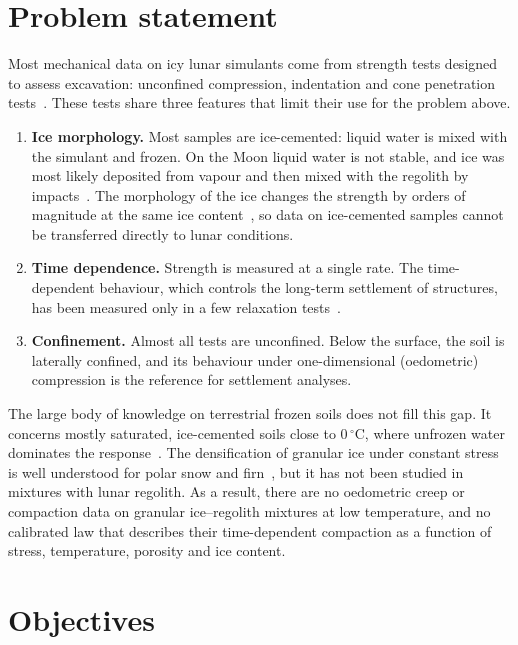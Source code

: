 \section*{Problem statement}

Most mechanical data on icy lunar simulants come from strength tests designed to assess excavation: unconfined compression, indentation and cone penetration tests~\cite{gertsch2006,pitcher2016,atkinson2020,liu2022,ricardo2026}. These tests share three features that limit their use for the problem above.
\begin{enumerate}
    \item \textbf{Ice morphology.} Most samples are ice-cemented: liquid water is mixed with the simulant and frozen. On the Moon liquid water is not stable, and ice was most likely deposited from vapour and then mixed with the regolith by impacts~\cite{cannon2020}. The morphology of the ice changes the strength by orders of magnitude at the same ice content~\cite{ricardo2026}, so data on ice-cemented samples cannot be transferred directly to lunar conditions.
    \item \textbf{Time dependence.} Strength is measured at a single rate. The time-dependent behaviour, which controls the long-term settlement of structures, has been measured only in a few relaxation tests~\cite{atkinson2020}.
    \item \textbf{Confinement.} Almost all tests are unconfined. Below the surface, the soil is laterally confined, and its behaviour under one-dimensional (oedometric) compression is the reference for settlement analyses.
\end{enumerate}
The large body of knowledge on terrestrial frozen soils does not fill this gap. It concerns mostly saturated, ice-cemented soils close to $0\,^\circ$C, where unfrozen water dominates the response~\cite{andersland2004,arenson2007}. The densification of granular ice under constant stress is well understood for polar snow and firn~\cite{herron1980,arnaud2000}, but it has not been studied in mixtures with lunar regolith. As a result, there are no oedometric creep or compaction data on granular ice--regolith mixtures at low temperature, and no calibrated law that describes their time-dependent compaction as a function of stress, temperature, porosity and ice content.

\section*{Objectives}

